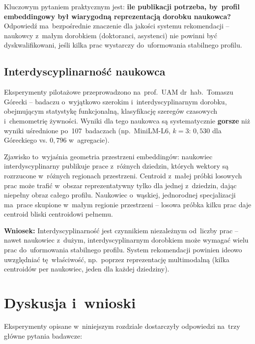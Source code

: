 Kluczowym pytaniem praktycznym jest: \textbf{ile publikacji potrzeba,
by~profil embeddingowy był wiarygodną reprezentacją dorobku naukowca?}
Odpowiedź ma~bezpośrednie znaczenie dla jakości systemu rekomendacji --
naukowcy z~małym dorobkiem (doktoranci, asystenci)
nie powinni być dyskwalifikowani, jeśli kilka prac wystarczy
do~uformowania stabilnego profilu.



\subsection{Interdyscyplinarność naukowca}
\label{subsec:interdisciplinarity}

Eksperymenty pilotażowe przeprowadzono na~prof.~UAM dr~hab.~Tomaszu
Górecki -- badaczu o~wyjątkowo szerokim i~interdyscyplinarnym dorobku,
obejmującym statystykę funkcjonalną, klasyfikację szeregów czasowych
i~chemometrię żywności.
Wyniki dla tego naukowca są systematycznie \textbf{gorsze} niż wyniki
uśrednione po~107~badaczach (np.\ MiniLM-L6, $k=3$: $0{,}530$
dla Góreckiego vs. $0{,}796$ w~agregacie).

Zjawisko to~wyjaśnia geometria przestrzeni embeddingów:
naukowiec interdyscyplinarny publikuje prace z~różnych dziedzin,
których wektory są rozrzucone w~różnych regionach przestrzeni.
Centroid z~małej próbki losowych prac może trafić
w~obszar reprezentatywny tylko dla jednej z~dziedzin,
dając niepełny obraz całego profilu.
Naukowiec o~wąskiej, jednorodnej specjalizacji ma~prace skupione
w~małym regionie przestrzeni -- losowa próbka kilku prac
daje centroid bliski centroidowi pełnemu.

\textbf{Wniosek:} Interdyscyplinarność jest czynnikiem niezależnym
od~liczby prac -- nawet naukowiec z~dużym, interdyscyplinarnym
dorobkiem może wymagać wielu prac do~uformowania stabilnego profilu.
System rekomendacji powinien ideowo uwzględniać tę~właściwość,
np.\ poprzez reprezentację multimodalną (kilka centroidów
per naukowiec, jeden dla każdej dziedziny).

\section{Dyskusja i~wnioski}
\label{sec:discussion}

Eksperymenty opisane w~niniejszym rozdziale dostarczyły odpowiedzi
na~trzy główne pytania badawcze:

